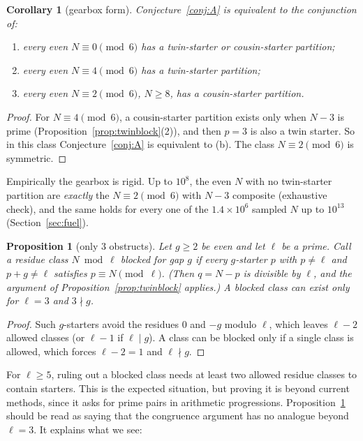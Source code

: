 \documentclass[11pt]{article}
\newtheorem{proposition}[theorem]{Proposition}
\newtheorem{corollary}[theorem]{Corollary}
\theoremstyle{definition}
\theoremstyle{remark}
\begin{document}
\begin{corollary}[gearbox form]\label{cor:gearbox}
Conjecture~\ref{conj:A} is equivalent to the conjunction of:
\begin{enumerate}
\item[(a)] every even $N\equiv 0\pmod 6$ has a twin-starter or cousin-starter
partition;
\item[(b)] every even $N\equiv 4\pmod 6$ has a twin-starter partition;
\item[(c)] every even $N\equiv 2\pmod 6$, $N\ge 8$, has a cousin-starter partition.
\end{enumerate}
\end{corollary}

\begin{proof}
For $N\equiv 4\pmod 6$, a cousin-starter partition exists only when $N-3$ is
prime (Proposition~\ref{prop:twinblock}(2)), and then $p=3$ is also a twin
starter. So in this class Conjecture~\ref{conj:A} is equivalent to (b). The
class $N\equiv 2\pmod 6$ is symmetric.
\end{proof}

Empirically the gearbox is rigid. Up to $10^8$, the even $N$ with no
twin-starter partition are \emph{exactly} the $N\equiv 2\pmod 6$ with $N-3$
composite (exhaustive check), and the same holds for every one of the
$1.4\times10^6$ sampled $N$ up to $10^{13}$ (Section~\ref{sec:fuel}).

\begin{proposition}[only $3$ obstructs]\label{prop:only3}
Let $g\ge 2$ be even and let $\ell$ be a prime. Call a residue class
$N\bmod \ell$ \emph{blocked for gap $g$} if every $g$-starter $p$ with $p\ne\ell$
and $p+g\ne\ell$ satisfies $p\equiv N\pmod\ell$. (Then $q=N-p$ is divisible
by $\ell$, and the argument of Proposition~\ref{prop:twinblock} applies.)
A blocked class can exist only for $\ell=3$ and $3\nmid g$.
\end{proposition}

\begin{proof}
Such $g$-starters avoid the residues $0$ and $-g$ modulo $\ell$, which leaves
$\ell-2$ allowed classes (or $\ell-1$ if $\ell\mid g$). A class can be blocked
only if a single class is allowed, which forces $\ell-2=1$ and $\ell\nmid g$.
\end{proof}

For $\ell\ge5$, ruling out a blocked class needs at least two allowed
residue classes to contain starters. This is the expected situation, but proving it
is beyond current methods, since it asks for prime pairs in arithmetic
progressions. Proposition~\ref{prop:only3} should be read as saying that the
congruence argument has no analogue beyond $\ell=3$. It explains what we see:
\end{document}
